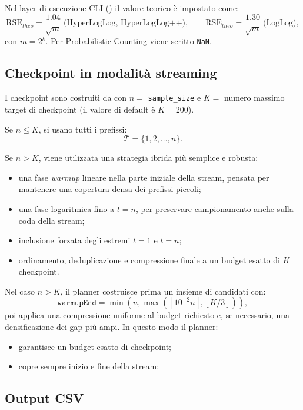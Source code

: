 Nel layer di esecuzione CLI () il valore teorico è impostato come:
\[
\mathrm{RSE}_{theo}= \frac{1.04}{\sqrt{m}} \ \text{(HyperLogLog, HyperLogLog++)},
\qquad
\mathrm{RSE}_{theo}= \frac{1.30}{\sqrt{m}} \ \text{(LogLog)},
\]
con \(m=2^k\).  
Per Probabilistic Counting viene scritto \texttt{NaN}.

\subsection{Checkpoint in modalità streaming}

I checkpoint sono costruiti da
 con \(n=\) \texttt{sample\_size}
e \(K=\) numero massimo target di checkpoint (il valore di default \`e \(K=200\)).

Se \(n \le K\), si usano tutti i prefissi:
\[
\mathcal{T}=\{1,2,\dots,n\}.
\]

Se \(n>K\), viene utilizzata una strategia ibrida più semplice e robusta:
\begin{itemize}
    \item una fase \emph{warmup} lineare nella parte iniziale della stream,
    pensata per mantenere una copertura densa dei prefissi piccoli;
    \item una fase logaritmica fino a \(t=n\), per preservare campionamento anche
    sulla coda della stream;
    \item inclusione forzata degli estremi \(t=1\) e \(t=n\);
    \item ordinamento, deduplicazione e compressione finale a un budget esatto di \(K\) checkpoint.
\end{itemize}

Nel caso \(n>K\), il planner costruisce prima un insieme di candidati con:
\[
\texttt{warmupEnd}=\min\!\left(n,\max\!\left(\left\lceil 10^{-2}n\right\rceil,\left\lfloor K/3 \right\rfloor\right)\right),
\]
poi applica una compressione uniforme al budget richiesto e, se necessario,
una densificazione dei gap più ampi. In questo modo il planner:
\begin{itemize}
    \item garantisce un budget esatto di checkpoint;
    \item copre sempre inizio e fine della stream;
\end{itemize}

\subsection{Output CSV}

